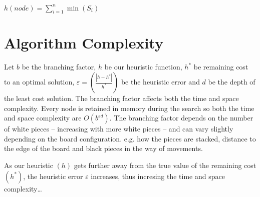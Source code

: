 \documentclass[a4paper,11pt]{article}
\begin{document}
$h(node) = \displaystyle\sum_{i=1}^n{\min\left(S_i\right)}$

\section*{Algorithm Complexity}
Let $b$ be the branching factor, $h$ be our heuristic function, $h^*$ be remaining cost to an optimal solution, $\varepsilon = \left(\frac{\left|h-h^* \right|}{h^*}\right)$ be the heuristic error and $d$ be the depth of the least cost solution.
The branching factor affects both the time and space complexity. 
Every node is retained in memory during the search so both the time and space complexity are $O(b^{\varepsilon d})$.
The branching factor depends on the number of white pieces -- increasing with more white pieces -- and can vary slightly depending on the board configuration. 
e.g. how the pieces are stacked, distance to the edge of the board and black pieces in the way of movements.

As our heuristic $(h)$ gets further away from the true value of the remaining cost $(h^*)$, the heuristic error $\varepsilon$ increases, thus incresing the time and space complexity\dots
\end{document}
